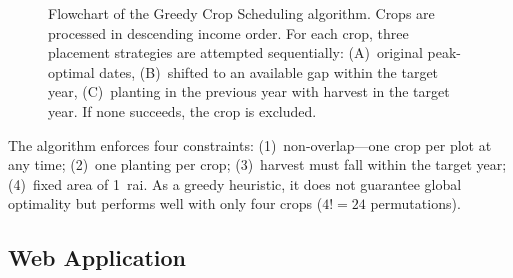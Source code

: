 \documentclass[conference]{IEEEtran}
\begin{document}
\begin{figure}[htbp]
  \caption{Flowchart of the Greedy Crop Scheduling algorithm. Crops are processed in descending income order. For each crop, three placement strategies are attempted sequentially: (A)~original peak-optimal dates, (B)~shifted to an available gap within the target year, (C)~planting in the previous year with harvest in the target year. If none succeeds, the crop is excluded.}
  \label{fig:flowchart}
\end{figure}

The algorithm enforces four constraints: (1)~non-overlap---one crop per plot at any time; (2)~one planting per crop; (3)~harvest must fall within the target year; (4)~fixed area of 1~rai. As a greedy heuristic, it does not guarantee global optimality but performs well with only four crops ($4! = 24$ permutations).

\subsection{Web Application}
\end{document}

